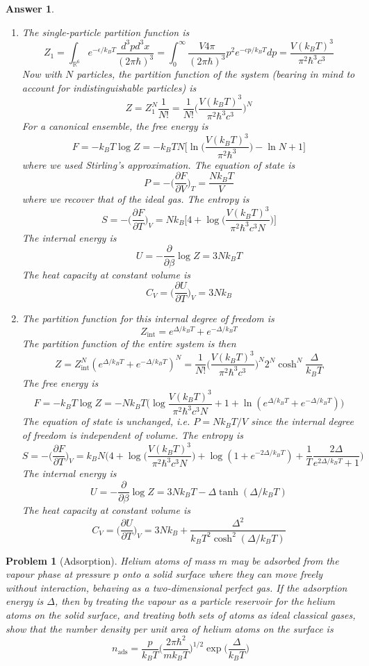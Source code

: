 \documentclass[a4paper]{article}
\newtheorem{ans}{Answer}[section]
\theoremstyle{new}
\newtheorem{qns}{Problem}[section]
\begin{document}
\begin{ans}\leavevmode
\begin{enumerate}[label=(\alph*)]
\item The single-particle partition function is
$$Z_1=\int_{\mathbb{R}^6} e^{-\epsilon/k_BT}\frac{d^3pd^3x}{(2\pi\hbar)^3}=\int_0^\infty\frac{V4\pi}{(2\pi\hbar)^3}p^2e^{-cp/k_BT}dp=\frac{V(k_BT)^3}{\pi^2\hbar^3c^3}$$
Now with $N$ particles, the partition function of the system (bearing in mind to account for indistinguishable particles) is
$$Z=Z_1^N\frac{1}{N!}=\frac{1}{N!}\bigg(\frac{V(k_BT)^3}{\pi^2\hbar^3c^3}\bigg)^N$$
For a canonical ensemble, the free energy is
$$F=-k_BT\log Z=-k_BTN\bigg[\ln\bigg(\frac{V(k_BT)^3}{\pi^2\hbar^3}\bigg)-\ln N+1\bigg]$$
where we used Stirling's approximation. The equation of state is
$$P=-\bigg(\frac{\partial F}{\partial V}\bigg)_T=\frac{Nk_BT}{V}$$
where we recover that of the ideal gas. The entropy is
$$S=-\bigg(\frac{\partial F}{\partial T}\bigg)_V=Nk_B\bigg[4+\log\bigg(\frac{V(k_BT)^3}{\pi^2\hbar^3c^3N}\bigg)\bigg]$$
The internal energy is
$$U=-\frac{\partial}{\partial\beta}\log Z=3Nk_BT$$
The heat capacity at constant volume is
$$C_V=\bigg(\frac{\partial U}{\partial T}\bigg)_V=3Nk_B$$
\item The partition function for this internal degree of freedom is 
$$Z_{\text{int}}=e^{\Delta/k_BT}+e^{-\Delta/k_BT}$$
The partition function of the entire system is then
$$Z=Z_{\text{int}}^N(e^{\Delta/k_BT}+e^{-\Delta/k_BT})^N=\frac{1}{N!}\bigg(\frac{V(k_BT)^3}{\pi^2\hbar^3c^3}\bigg)^N2^N\cosh^N\frac{\Delta}{k_BT}$$
The free energy is 
$$F=-k_BT\log Z=-Nk_BT\bigg(\log\frac{V(k_BT)^3}{\pi^2\hbar^3c^3N}+1+\ln(e^{\Delta/k_BT}+e^{-\Delta/k_BT})\bigg)$$
The equation of state is unchanged, i.e. $P=Nk_BT/V$ since the internal degree of freedom is independent of volume. The entropy is
$$S=-\bigg(\frac{\partial F}{\partial T}\bigg)_V=k_BN\bigg(4+\log\bigg(\frac{V(k_BT)^3}{\pi^2\hbar^3c^3N}\bigg)+\log(1+e^{-2\Delta/k_BT})+\frac{1}{T}\frac{2\Delta}{e^{2\Delta/k_BT}+1}\bigg)$$
The internal energy is
$$U=-\frac{\partial}{\partial\beta}\log Z=3Nk_BT-\Delta\tanh(\Delta/k_BT)$$
The heat capacity at constant volume is
$$C_V=\bigg(\frac{\partial U}{\partial T}\bigg)_V=3Nk_B+\frac{\Delta^2}{k_BT^2\cosh^2(\Delta/k_BT)}$$
\end{enumerate}
\end{ans}
\begin{qns}[Adsorption]
Helium atoms of mass $m$ may be adsorbed from the vapour phase at pressure $p$ onto a solid surface where they can move freely without interaction, behaving as a two-dimensional perfect gas. If the adsorption energy is $\Delta$, then by treating the vapour as a particle reservoir for the helium atoms on the solid surface, and treating both sets of atoms as ideal classical gases, show that the number density per unit area of helium atoms on the surface is
$$n_{\text{ads}}=\frac{p}{k_BT}\bigg(\frac{2\pi\hbar^2}{mk_BT}\bigg)^{1/2}\exp\bigg(\frac{\Delta}{k_BT}\bigg)$$
\end{qns}
\end{document}
